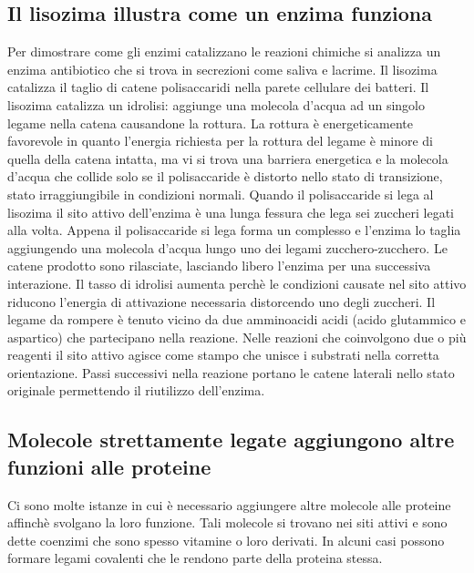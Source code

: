 \subsection{Il lisozima illustra come un enzima funziona}
Per dimostrare come gli enzimi catalizzano le reazioni chimiche si analizza un enzima antibiotico che si trova in secrezioni come saliva e lacrime. Il lisozima catalizza il taglio di 
catene polisaccaridi nella parete cellulare dei batteri. Il lisozima catalizza un idrolisi: aggiunge una molecola d'acqua ad un singolo legame nella catena causandone la rottura. La 
rottura \`e energeticamente favorevole in quanto l'energia richiesta per la rottura del legame \`e minore di quella della catena intatta, ma vi si trova una barriera energetica e la
molecola d'acqua che collide solo se il polisaccaride \`e distorto nello stato di transizione, stato irraggiungibile in condizioni normali. Quando il polisaccaride si lega al lisozima 
il sito attivo dell'enzima \`e una lunga fessura che lega sei zuccheri legati alla volta. Appena il polisaccaride si lega forma un complesso e l'enzima lo taglia aggiungendo una 
molecola d'acqua lungo uno dei legami zucchero-zucchero. Le catene prodotto sono rilasciate, lasciando libero l'enzima per una successiva interazione. Il tasso di idrolisi aumenta 
perch\`e le condizioni causate nel sito attivo riducono l'energia di attivazione necessaria distorcendo uno degli zuccheri. Il legame da rompere \`e tenuto vicino da due amminoacidi
acidi (acido glutammico e aspartico) che partecipano nella reazione. Nelle reazioni che coinvolgono due o pi\`u reagenti il sito attivo agisce come stampo che unisce i substrati nella
corretta orientazione. Passi successivi nella reazione portano le catene laterali nello stato originale permettendo il riutilizzo dell'enzima.
\subsection{Molecole strettamente legate aggiungono altre funzioni alle proteine}
Ci sono molte istanze in cui \`e necessario aggiungere altre molecole alle proteine affinch\`e svolgano la loro funzione. Tali molecole si trovano nei siti attivi e sono dette 
coenzimi che sono spesso vitamine o loro derivati. In alcuni casi possono formare legami covalenti che le rendono parte della proteina stessa.
